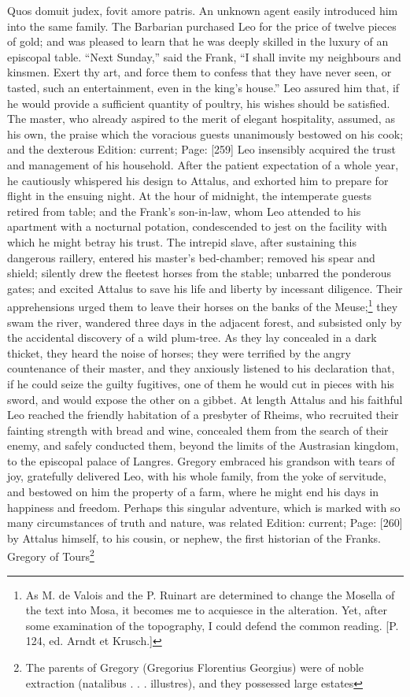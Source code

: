 {Quos domuit judex, fovit amore patris.} An unknown agent easily introduced him into the same family. The Barbarian purchased Leo for the price of twelve pieces of gold; and was pleased to learn that he was deeply skilled in the luxury of an episcopal table. \texthebrew{“}Next Sunday,\texthebrew{}” said the Frank, \texthebrew{“}I shall invite my neighbours and kinsmen. Exert thy art, and force them to confess that they have never seen, or tasted, such an entertainment, even in the king\texthebrew{}’s house.\texthebrew{}” Leo assured him that, if he would provide a sufficient quantity of poultry, his wishes should be satisfied. The master, who already aspired to the merit of elegant hospitality, assumed, as his own, the praise which the voracious guests unanimously bestowed on his cook; and the dexterous Edition: current; Page: [259] Leo insensibly acquired the trust and management of his household. After the patient expectation of a whole year, he cautiously whispered his design to Attalus, and exhorted him to prepare for flight in the ensuing night. At the hour of midnight, the intemperate guests retired from table; and the Frank\texthebrew{}’s son-in-law, whom Leo attended to his apartment with a nocturnal potation, condescended to jest on the facility with which he might betray his trust. The intrepid slave, after sustaining this dangerous raillery, entered his master\texthebrew{}’s bed-chamber; removed his spear and shield; silently drew the fleetest horses from the stable; unbarred the ponderous gates; and excited Attalus to save his life and liberty by incessant diligence. Their apprehensions urged them to leave their horses on the banks of the Meuse;\footnote{As M. de Valois and the P. Ruinart are determined to change the Mosella of the text into Mosa, it becomes me to acquiesce in the alteration. Yet, after some examination of the topography, I could defend the common reading. [P. 124, ed. Arndt et Krusch.]} they swam the river, wandered three days in the adjacent forest, and subsisted only by the accidental discovery of a wild plum-tree. As they lay concealed in a dark thicket, they heard the noise of horses; they were terrified by the angry countenance of their master, and they anxiously listened to his declaration that, if he could seize the guilty fugitives, one of them he would cut in pieces with his sword, and would expose the other on a gibbet. At length Attalus and his faithful Leo reached the friendly habitation of a presbyter of Rheims, who recruited their fainting strength with bread and wine, concealed them from the search of their enemy, and safely conducted them, beyond the limits of the Austrasian kingdom, to the episcopal palace of Langres. Gregory embraced his grandson with tears of joy, gratefully delivered Leo, with his whole family, from the yoke of servitude, and bestowed on him the property of a farm, where he might end his days in happiness and freedom. Perhaps this singular adventure, which is marked with so many circumstances of truth and nature, was related Edition: current; Page: [260] by Attalus himself, to his cousin, or nephew, the first historian of the Franks. Gregory of Tours\footnote{The parents of Gregory (Gregorius Florentius Georgius) were of noble extraction (natalibus . . . illustres), and they possessed large estates }

